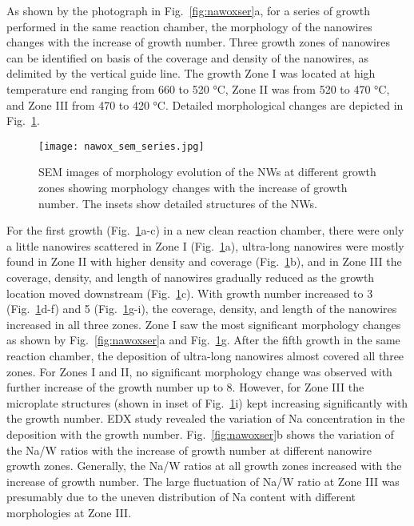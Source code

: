 As shown by the photograph in Fig.~\ref{fig:nawoxser}a, for a series of growth performed in the same reaction chamber, the morphology of the nanowires changes with the increase of growth number. Three growth zones of nanowires can be identified on basis of the coverage and density of the nanowires, as delimited by the vertical guide line. The growth Zone I was located at high temperature end ranging from 660 to 520 \si{\degreeCelsius}, Zone II was from 520 to 470 \si{\degreeCelsius}, and Zone III from 470 to 420 \si{\degreeCelsius}. Detailed morphological changes are depicted in Fig.~\ref{fig:nawoxsemall}.
\begin{figure}[htb]
\centering
\texttt{[image: nawox\_sem\_series.jpg]}
\caption[SEM images of morphology evolution]{SEM images of morphology evolution of the NWs at different growth zones showing morphology changes with the increase of growth number. The insets show detailed structures of the NWs.}
\label{fig:nawoxsemall}
\end{figure}
For the first growth (Fig.~\ref{fig:nawoxsemall}a-c) in a new clean reaction chamber, there were only a little nanowires scattered in Zone I (Fig.~\ref{fig:nawoxsemall}a), ultra-long nanowires were mostly found in Zone II with higher density and coverage (Fig.~\ref{fig:nawoxsemall}b), and in Zone III the coverage, density, and length of nanowires gradually reduced as the growth location moved downstream (Fig.~\ref{fig:nawoxsemall}c). With growth number increased to 3 (Fig.~\ref{fig:nawoxsemall}d-f) and 5 (Fig.~\ref{fig:nawoxsemall}g-i), the coverage, density, and length of the nanowires increased in all three zones. Zone I saw the most significant morphology changes as shown by Fig.~\ref{fig:nawoxser}a and Fig.~\ref{fig:nawoxsemall}g. After the fifth growth in the same reaction chamber, the deposition of ultra-long nanowires almost covered all three zones. For Zones I and II, no significant morphology change was observed with further increase of the growth number up to 8. However, for Zone III the microplate structures (shown in inset of Fig.~\ref{fig:nawoxsemall}i) kept increasing significantly with the growth number. EDX study revealed the variation of Na concentration in the deposition with the growth number. Fig.~\ref{fig:nawoxser}b shows the variation of the Na/W ratios with the increase of growth number at different nanowire growth zones. Generally, the Na/W ratios at all growth zones increased with the increase of growth number. The large fluctuation of Na/W ratio at Zone III was presumably due to the uneven distribution of Na content with different morphologies at Zone III.

